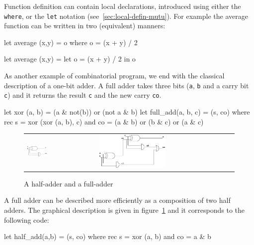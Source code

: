 \documentclass[11pt,titlepage,twoside]{report}
\begin{document}
Function definition can contain local declarations, introduced using
either the {\tt where}, or the {\tt let} notation
(see~\ref{sec:local-defin-mutu}). For example the average function can
be written in two (equivalent) manners:
\begin{runverbatim}
let average (x,y) = o where o = (x + y) / 2
\end{runverbatim}
\begin{runverbatim}
let average (x,y) =
  let o = (x + y) / 2 in o
\end{runverbatim}

As another example of combinatorial program, we end with the classical
description of a one-bit adder. A full adder takes three bits
(\verb-a-, \verb-b- and a carry bit \verb-c-) and it returns the
result \verb-c- and the new carry \verb-co-.
\begin{runverbatim}[withresult]
let xor (a, b) = (a & not(b)) or (not a & b)
let full_add(a, b, c) = (s, co) where
   rec s = xor (xor (a, b), c)
   and co = (a & b) or (b & c) or (a & c)
\end{runverbatim}

\begin{figure}
\begin{center}
\begin{tabular}{ll}
\includegraphics[width=0.3\textwidth]{Fig/half_adder}
& \quad\quad
\includegraphics[width=0.5\textwidth]{Fig/full_adder}
\end{tabular}
\end{center}
\caption{A half-adder and a full-adder~\label{half-adder}}
\end{figure}

A full adder can be described more efficiently as a composition
of two half adders. The graphical description is given in
figure~\ref{half-adder} and it corresponds to the following code:
\begin{runverbatim}
let half_add(a,b) = (s, co) where
   rec s = xor (a, b)
   and co = a & b
\end{runverbatim}
\end{document}
